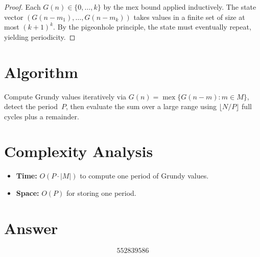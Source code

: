 \documentclass[11pt]{article}
\begin{document}
\begin{proof}
Each $G(n)\in\{0,\ldots,k\}$ by the mex bound applied inductively. The state vector $(G(n-m_1),\ldots,G(n-m_k))$ takes values in a finite set of size at most $(k+1)^k$. By the pigeonhole principle, the state must eventually repeat, yielding periodicity.
\end{proof}

\section{Algorithm}

Compute Grundy values iteratively via $G(n)=\operatorname{mex}\{G(n-m):m\in M\}$, detect the period~$P$, then evaluate the sum over a large range using $\lfloor N/P\rfloor$ full cycles plus a remainder.

\section{Complexity Analysis}

\begin{itemize}
\item \textbf{Time:} $O(P\cdot|M|)$ to compute one period of Grundy values.
\item \textbf{Space:} $O(P)$ for storing one period.
\end{itemize}

\section{Answer}

\[
\boxed{552839586}
\]
\end{document}
